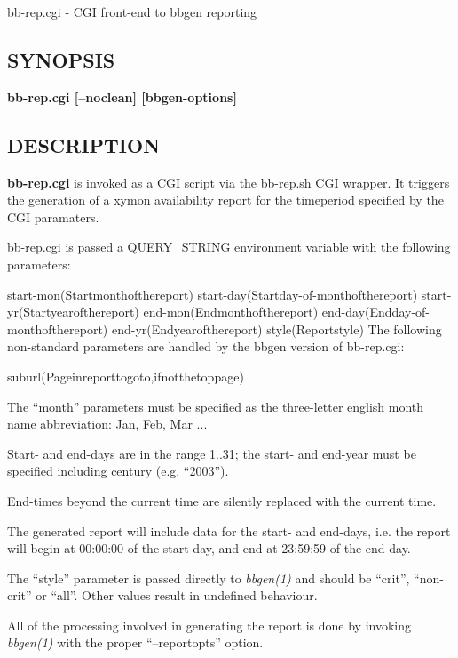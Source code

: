  bb-rep.cgi - CGI front-end to bbgen reporting
 \subsection{SYNOPSIS}
\textbf{bb-rep.cgi [--noclean] [bbgen-options]}


 
\subsection{DESCRIPTION}
\textbf{bb-rep.cgi}
 is invoked as a CGI script via the bb-rep.sh CGI wrapper. It triggers the generation of a xymon availability report for the timeperiod specified by the CGI paramaters. 

  bb-rep.cgi is passed a QUERY\_STRING environment variable with the following parameters: 


  
start-mon(Startmonthofthereport)  
start-day(Startday-of-monthofthereport)  
start-yr(Startyearofthereport)  
end-mon(Endmonthofthereport)  
end-day(Endday-of-monthofthereport)  
end-yr(Endyearofthereport)  
style(Reportstyle)  
 The following non-standard parameters are handled by the bbgen version of bb-rep.cgi: 


  
suburl(Pageinreporttogoto,ifnotthetoppage) 


  The ``month'' parameters must be specified as the three-letter english month name abbreviation: Jan, Feb, Mar ... 


  Start- and end-days are in the range 1..31; the start- and end-year must be specified including century (e.g. ``2003''). 


  End-times beyond the current time are silently replaced with the current time. 


  The generated report will include data for the start- and end-days, i.e. the report will begin at 00:00:00 of the start-day, and end at 23:59:59 of the end-day. 


  The ``style'' parameter is passed directly to \emph{bbgen(1)}
 and should be ``crit'', ``non-crit'' or ``all''. Other values result in undefined behaviour. 


  All of the processing involved in generating the report is done by invoking \emph{bbgen(1)}
 with the proper ``--reportopts'' option. 


 
